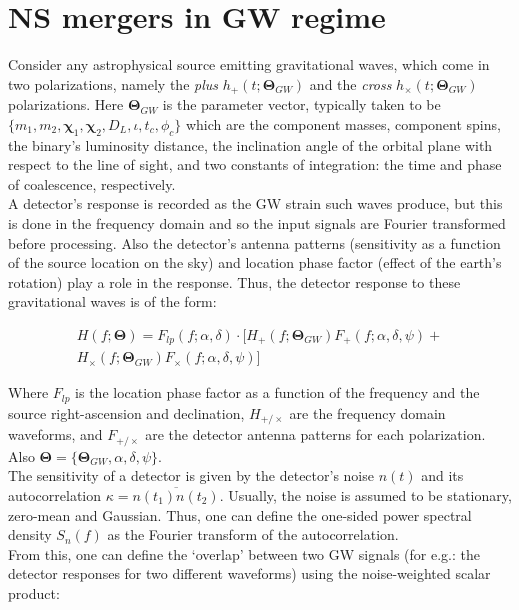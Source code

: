 \section{NS mergers in GW regime}
    \label{sec:ns_in_gw}

    Consider any astrophysical source emitting gravitational waves, which come in two
    polarizations, namely the \emph{plus} $h_{+}(t; \mathbf{\Theta}_{GW})$ and the
    \emph{cross} $h_{\times}(t; \mathbf{\Theta}_{GW})$ polarizations. Here
    $\mathbf{\Theta}_{GW}$ is the parameter vector, typically taken to be $\{m_1, m_2,
    \mathbf{\chi}_1, \mathbf{\chi}_2, D_L, \iota, t_c, \phi_c\}$ which are the component
    masses, component spins, the binary's luminosity distance, the inclination angle
    of the orbital plane with respect to the line of sight, and two constants of
    integration: the time and phase of coalescence, respectively.\\
    A detector's response is recorded as the GW strain such waves produce, but this is
    done in the frequency domain and so the input signals are Fourier transformed before
    processing. Also the detector's antenna patterns (sensitivity as a function of the
    source location on the sky) and location phase factor (effect of the earth's
    rotation) play a role in the response. Thus, the detector response to these
    gravitational waves is of the form:

    \begin{multline}
        H(f; \mathbf{\Theta}) =
            F_{lp}(f; \alpha, \delta) \cdot
            [
                H_{+}(f; \mathbf{\Theta}_{GW}) F_{+}(f; \alpha, \delta, \psi) + \\
                H_{\times}(f; \mathbf{\Theta}_{GW}) F_{\times}(f; \alpha, \delta, \psi)
            ]
    \end{multline}

    Where $F_{lp}$ is the location phase factor as a function of the frequency and the
    source right-ascension and declination, $H_{+/\times}$ are the frequency domain
    waveforms, and $F_{+/\times}$ are the detector antenna patterns for each
    polarization. Also $\mathbf{\Theta} = \{\mathbf{\Theta}_{GW}, \alpha, \delta,
    \psi\}$.\\ The sensitivity of a detector is given by the detector's noise $n(t)$ and
    its autocorrelation $\kappa = \overline{n(t_1)n(t_2)}$. Usually, the noise is
    assumed to be stationary, zero-mean and Gaussian. Thus, one can define the one-sided
    power spectral density $S_n(f)$ as the Fourier transform of the autocorrelation.\\
    From this, one can define the `overlap' between two GW signals (for e.g.: the
    detector responses for two different waveforms) using the noise-weighted scalar
    product:

